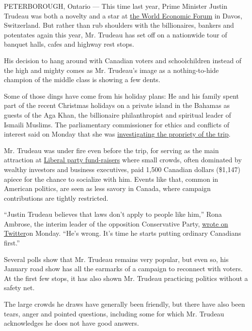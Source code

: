 PETERBOROUGH, Ontario --- This time last year, Prime Minister Justin
Trudeau was both a novelty and a star at
\href{https://www.nytimes.com/2016/01/22/business/dealbook/justin-trudeau-carries-his-look-to-canada-image-to-davos.html}{the
World Economic Forum} in Davos, Switzerland. But rather than rub
shoulders with the billionaires, bankers and potentates again this year,
Mr. Trudeau has set off on a nationwide tour of banquet halls, cafes and
highway rest stops.

His decision to hang around with Canadian voters and schoolchildren
instead of the high and mighty comes as Mr. Trudeau's image as a
nothing-to-hide champion of the middle class is showing a few dents.

Some of those dings have come from his holiday plans: He and his family
spent part of the recent Christmas holidays on a private island in the
Bahamas as guests of the Aga Khan, the billionaire philanthropist and
spiritual leader of Ismaili Muslims. The parliamentary commissioner for
ethics and conflicts of interest said on Monday that she was
\href{https://www.nytimes.com/2017/01/16/world/americas/justin-trudeau-canada-aga-khan-ethics-investigation-mary-dawson.html}{investigating
the propriety of the trip}.

Mr. Trudeau was under fire even before the trip, for serving as the main
attraction at
\href{https://www.nytimes.com/2016/11/24/world/americas/canada-justin-trudeau-donors.html}{Liberal
party fund-raisers} where small crowds, often dominated by wealthy
investors and business executives, paid 1,500 Canadian dollars (\$1,147)
apiece for the chance to socialize with him. Events like that, common in
American politics, are seen as less savory in Canada, where campaign
contributions are tightly restricted.

``Justin Trudeau believes that laws don't apply to people like him,''
Rona Ambrose, the interim leader of the opposition Conservative Party,
\href{https://twitter.com/RonaAmbrose/status/821007536853807104}{wrote
on Twitter}on Monday. ``He's wrong. It's time he starts putting ordinary
Canadians first.''

Several polls show that Mr. Trudeau remains very popular, but even so,
his January road show has all the earmarks of a campaign to reconnect
with voters. At the first few stops, it has also shown Mr. Trudeau
practicing politics without a safety net.

The large crowds he draws have generally been friendly, but there have
also been tears, anger and pointed questions, including some for which
Mr. Trudeau acknowledges he does not have good answers.

